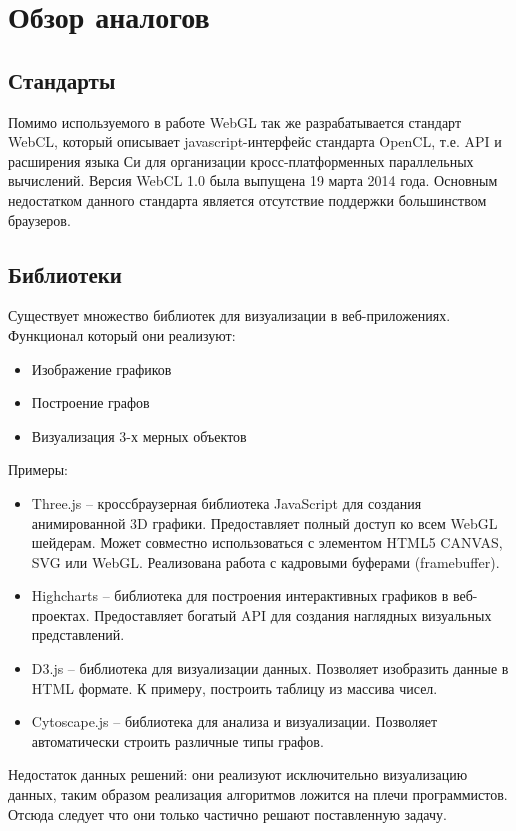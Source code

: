 \newpage
\section{Обзор аналогов}

\subsection{Стандарты}

Помимо используемого в работе WebGL так же разрабатывается стандарт WebCL, который описывает 
javascript-интерфейс стандарта OpenCL, т.е. API и расширения языка Си для организации
кросс-платформенных параллельных вычислений. Версия WebCL 1.0 была выпущена 19 марта 2014 года.
Основным недостатком данного стандарта является отсутствие поддержки большинством браузеров.

\subsection{Библиотеки}
Существует множество библиотек для визуализации в веб-приложениях. Функционал который они реализуют:
\begin{itemize}
  \item Изображение графиков
  \item Построение графов
  \item Визуализация 3-х мерных объектов
\end{itemize}

Примеры:
\begin{itemize}
  \item Three.js -- кроссбраузерная библиотека JavaScript для создания анимированной 3D графики.
    Предоставляет полный доступ ко всем WebGL шейдерам. Может совместно использоваться с элементом
    HTML5 CANVAS, SVG или WebGL. Реализована работа с кадровыми буферами (framebuffer).

  \item Highcharts -- библиотека для построения интерактивных графиков в веб-проектах. Предоставляет
    богатый API для создания наглядных визуальных представлений.

  \item D3.js -- библиотека для визуализации данных. Позволяет изобразить данные в HTML формате. 
    К примеру, построить таблицу из массива чисел.
    
  \item Cytoscape.js -- библиотека для анализа и визуализации. Позволяет автоматически 
    строить различные типы графов.
\end{itemize}

Недостаток данных решений: они реализуют исключительно визуализацию данных, таким образом реализация
алгоритмов ложится на плечи программистов. Отсюда следует что они только частично решают поставленную
задачу.
